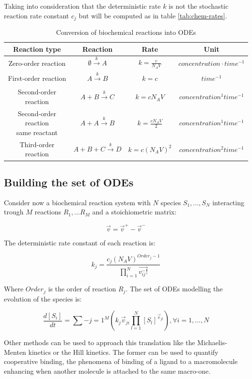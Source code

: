   Taking into consideration that the deterministic rate $k$ is not the stochastic reaction rate constant $c_j$ but will be computed as in table \ref{tab:chem-rates}.

  \begin{table}[H]
    \centering
    \begin{tabular}{c c c c}
      \hline
      Reaction type & Reaction & Rate & Unit\\
      \hline
      Zero-order reaction & $\emptyset\xrightarrow[]{k} A$ & $k = \frac{c}{N_AV}$ & $concentration\cdot time^{-1}$\\
      First-order reaction & $A\xrightarrow[]{k} B$ &  $k = c$ & $time^{-1}$\\
      Second-order reaction & $A+B\xrightarrow[]{k} C$ & $k = cN_AV$ & $concentration^1time^{-1}$\\
      \makecell{Second-order reaction\\ same reactant} & $A+A\xrightarrow[]{k} B$ & $k = \frac{cN_AV}{2}$ & $concentration^1time^{-1}$\\
      Third-order reaction & $A+B+C\xrightarrow[]{k} D$ & $k = c(N_AV)^2$ & $concentration^2time^{-1}$\\
      \hline
    \end{tabular}
    \caption{Conversion of biochemical reactions into ODEs}
    \label{tab:chem-odes}
  \end{table}

  \subsection{Building the set of ODEs}
  Consider now a biochemical reaction system with $N$ species $S_1, \dots, S_N$ interacting trough $M$ reactions $R_1, \dots R_M$ and a stoichiometric matrix:

  $$\vec{v} = \vec{v}^+-\vec{v}^-$$

  The deterministic rate constant of each reaction is:

  $$k_j = \frac{c_j(N_AV)^{Order_j-1}}{\prod\limits_{i=1}^N\vec{v_{ij}^-!}}$$

  Where $Order_j$ is the order of reaction $R_j$.
  The set of ODEs modelling the evolution of the species is:

  $$\frac{d[S_i]}{dt} = \sum\limits-{j=1}^M\left(k_j\vec{v}_{ji}\prod\limits_{l=1}^N[S_l]^{\vec{v}_{jl}}\right), \forall i = 1, \dots, N$$

  Other methods can be used to approach this translation like the Michaelis-Menten kinetics or the Hill kinetics.
  The former can be used to quantify cooperative binding, the phenomena of binding of a ligand to a macromolecule enhancing when another molecule is attached to the same macro-one.

